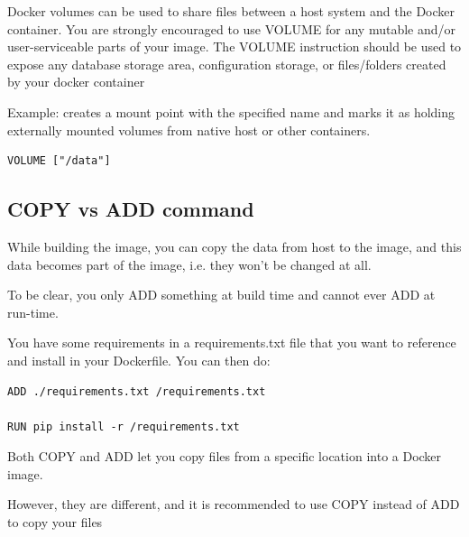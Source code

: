 Docker volumes can be used to share files between a host system and the Docker container. 
You are strongly encouraged to use VOLUME for any mutable and/or user-serviceable parts of your image.
The VOLUME instruction should be used to expose any database storage area,
configuration storage, or files/folders created by your docker container

Example: creates a mount point with the specified name and marks it as holding externally mounted volumes from native host or other containers.
\begin{verbatim}
VOLUME ["/data"]
\end{verbatim}



\subsection{COPY vs ADD command}

While building the image, you can copy the data from host to the image, and this
data becomes part of the image, i.e. they won't be changed at all.

To be clear, you only ADD something at build time and cannot ever ADD at run-time.


You have some requirements in a requirements.txt file that you want to reference and install in your Dockerfile. You can then do: 
\begin{verbatim}
ADD ./requirements.txt /requirements.txt 

RUN pip install -r /requirements.txt
\end{verbatim}

Both COPY and ADD let you copy files from a specific location into a Docker image.


However, they are different, and it is recommended to use COPY instead of ADD to copy your files

